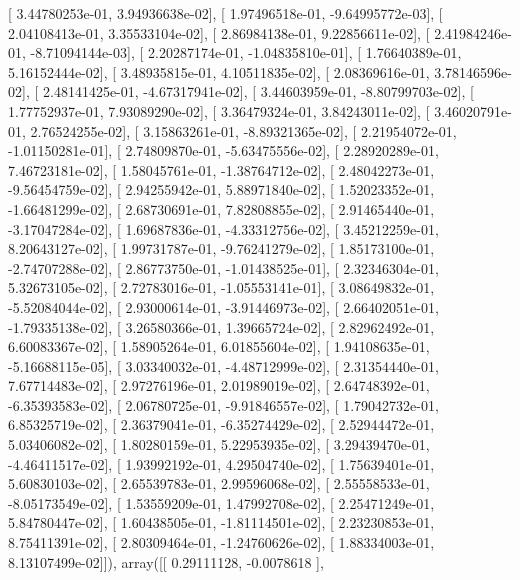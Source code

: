 \documentclass{article}
\begin{document}
       [  3.44780253e-01,   3.94936638e-02],
       [  1.97496518e-01,  -9.64995772e-03],
       [  2.04108413e-01,   3.35533104e-02],
       [  2.86984138e-01,   9.22856611e-02],
       [  2.41984246e-01,  -8.71094144e-03],
       [  2.20287174e-01,  -1.04835810e-01],
       [  1.76640389e-01,   5.16152444e-02],
       [  3.48935815e-01,   4.10511835e-02],
       [  2.08369616e-01,   3.78146596e-02],
       [  2.48141425e-01,  -4.67317941e-02],
       [  3.44603959e-01,  -8.80799703e-02],
       [  1.77752937e-01,   7.93089290e-02],
       [  3.36479324e-01,   3.84243011e-02],
       [  3.46020791e-01,   2.76524255e-02],
       [  3.15863261e-01,  -8.89321365e-02],
       [  2.21954072e-01,  -1.01150281e-01],
       [  2.74809870e-01,  -5.63475556e-02],
       [  2.28920289e-01,   7.46723181e-02],
       [  1.58045761e-01,  -1.38764712e-02],
       [  2.48042273e-01,  -9.56454759e-02],
       [  2.94255942e-01,   5.88971840e-02],
       [  1.52023352e-01,  -1.66481299e-02],
       [  2.68730691e-01,   7.82808855e-02],
       [  2.91465440e-01,  -3.17047284e-02],
       [  1.69687836e-01,  -4.33312756e-02],
       [  3.45212259e-01,   8.20643127e-02],
       [  1.99731787e-01,  -9.76241279e-02],
       [  1.85173100e-01,  -2.74707288e-02],
       [  2.86773750e-01,  -1.01438525e-01],
       [  2.32346304e-01,   5.32673105e-02],
       [  2.72783016e-01,  -1.05553141e-01],
       [  3.08649832e-01,  -5.52084044e-02],
       [  2.93000614e-01,  -3.91446973e-02],
       [  2.66402051e-01,  -1.79335138e-02],
       [  3.26580366e-01,   1.39665724e-02],
       [  2.82962492e-01,   6.60083367e-02],
       [  1.58905264e-01,   6.01855604e-02],
       [  1.94108635e-01,  -5.16688115e-05],
       [  3.03340032e-01,  -4.48712999e-02],
       [  2.31354440e-01,   7.67714483e-02],
       [  2.97276196e-01,   2.01989019e-02],
       [  2.64748392e-01,  -6.35393583e-02],
       [  2.06780725e-01,  -9.91846557e-02],
       [  1.79042732e-01,   6.85325719e-02],
       [  2.36379041e-01,  -6.35274429e-02],
       [  2.52944472e-01,   5.03406082e-02],
       [  1.80280159e-01,   5.22953935e-02],
       [  3.29439470e-01,  -4.46411517e-02],
       [  1.93992192e-01,   4.29504740e-02],
       [  1.75639401e-01,   5.60830103e-02],
       [  2.65539783e-01,   2.99596068e-02],
       [  2.55558533e-01,  -8.05173549e-02],
       [  1.53559209e-01,   1.47992708e-02],
       [  2.25471249e-01,   5.84780447e-02],
       [  1.60438505e-01,  -1.81114501e-02],
       [  2.23230853e-01,   8.75411391e-02],
       [  2.80309464e-01,  -1.24760626e-02],
       [  1.88334003e-01,   8.13107499e-02]]), array([[ 0.29111128, -0.0078618 ],
\end{document}
